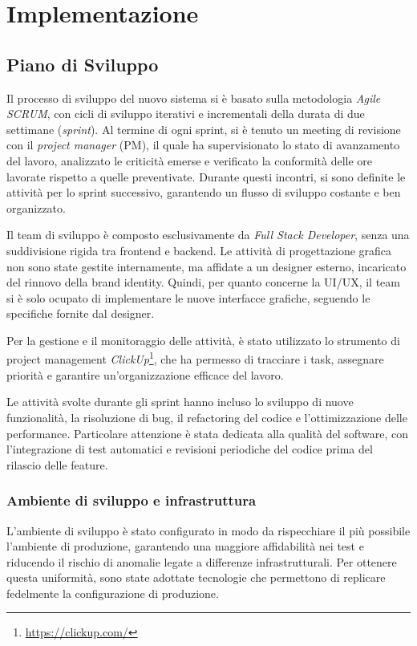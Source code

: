 \chapter{Implementazione}

\section{Piano di Sviluppo}
Il processo di sviluppo del nuovo sistema si è basato sulla metodologia \textit{Agile SCRUM}, con cicli di sviluppo iterativi e incrementali della durata di due settimane (\textit{sprint}). Al termine di ogni sprint, si è tenuto un meeting di revisione con il \textit{project manager} (PM), il quale ha supervisionato lo stato di avanzamento del lavoro, analizzato le criticità emerse e verificato la conformità delle ore lavorate rispetto a quelle preventivate. Durante questi incontri, si sono definite le attività per lo sprint successivo, garantendo un flusso di sviluppo costante e ben organizzato.

Il team di sviluppo è composto esclusivamente da \textit{Full Stack Developer}, senza una suddivisione rigida tra frontend e backend. Le attività di progettazione grafica non sono state gestite internamente, ma affidate a un designer esterno, incaricato del rinnovo della brand identity. Quindi, per quanto concerne la UI/UX, il team si è solo ocupato di implementare le nuove interfacce grafiche, seguendo le specifiche fornite dal designer.

Per la gestione e il monitoraggio delle attività, è stato utilizzato lo strumento di project management \textit{ClickUp}\footnote{\url{https://clickup.com/}}, che ha permesso di tracciare i task, assegnare priorità e garantire un'organizzazione efficace del lavoro.

Le attività svolte durante gli sprint hanno incluso lo sviluppo di nuove funzionalità, la risoluzione di bug, il refactoring del codice e l'ottimizzazione delle performance. Particolare attenzione è stata dedicata alla qualità del software, con l'integrazione di test automatici e revisioni periodiche del codice prima del rilascio delle feature.

\subsection{Ambiente di sviluppo e infrastruttura}
L'ambiente di sviluppo è stato configurato in modo da rispecchiare il più possibile l'ambiente di produzione, garantendo una maggiore affidabilità nei test e riducendo il rischio di anomalie legate a differenze infrastrutturali. Per ottenere questa uniformità, sono state adottate tecnologie che permettono di replicare fedelmente la configurazione di produzione.

